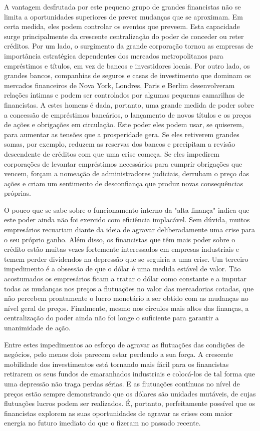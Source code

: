 \documentclass[12pt]{article}
\begin{document}
A vantagem desfrutada por este pequeno grupo de grandes financistas não se limita a oportunidades superiores de prever mudanças que se aproximam. Em certa medida, eles podem controlar os eventos que preveem. Esta capacidade surge principalmente da crescente centralização do poder de conceder ou reter créditos. Por um lado, o surgimento da grande corporação tornou as empresas de importância estratégica dependentes dos mercados metropolitanos para empréstimos e títulos, em vez de bancos e investidores locais. Por outro lado, os grandes bancos, companhias de seguros e casas de investimento que dominam os mercados financeiros de Nova York, Londres, Paris e Berlim desenvolveram relações íntimas e podem ser controlados por algumas pequenas camarilhas de financistas. A estes homens é dada, portanto, uma grande medida de poder sobre a concessão de empréstimos bancários, o lançamento de novos títulos e os preços de ações e obrigações em circulação. Este poder eles podem usar, se quiserem, para aumentar as tensões que a prosperidade gera. Se eles retiverem grandes somas, por exemplo, reduzem as reservas dos bancos e precipitam a revisão descendente de créditos com que uma crise começa. Se eles impedirem corporações de levantar empréstimos necessários para cumprir obrigações que vencem, forçam a nomeação de administradores judiciais, derrubam o preço das ações e criam um sentimento de desconfiança que produz novas consequências próprias.

O pouco que se sabe sobre o funcionamento interno da "alta finança" indica que este poder ainda não foi exercido com eficiência implacável. Sem dúvida, muitos empresários recuariam diante da ideia de agravar deliberadamente uma crise para o seu próprio ganho. Além disso, os financistas que têm mais poder sobre o crédito estão muitas vezes fortemente interessados em empresas industriais e temem perder dividendos na depressão que se seguiria a uma crise. Um terceiro impedimento é a obsessão de que o dólar é uma medida estável de valor. Tão acostumados os empresários ficam a tratar o dólar como constante e a imputar todas as mudanças nos preços a flutuações no valor das mercadorias cotadas, que não percebem prontamente o lucro monetário a ser obtido com as mudanças no nível geral de preços. Finalmente, mesmo nos círculos mais altos das finanças, a centralização do poder ainda não foi longe o suficiente para garantir a unanimidade de ação.

Entre estes impedimentos ao esforço de agravar as flutuações das condições de negócios, pelo menos dois parecem estar perdendo a sua força. A crescente mobilidade dos investimentos está tornando mais fácil para os financistas retirarem os seus fundos de emaranhados industriais e colocá-los de tal forma que uma depressão não traga perdas sérias. E as flutuações contínuas no nível de preços estão sempre demonstrando que os dólares são unidades mutáveis, de cujas flutuações lucros podem ser realizados. É, portanto, perfeitamente possível que os financistas explorem as suas oportunidades de agravar as crises com maior energia no futuro imediato do que o fizeram no passado recente.
\end{document}
